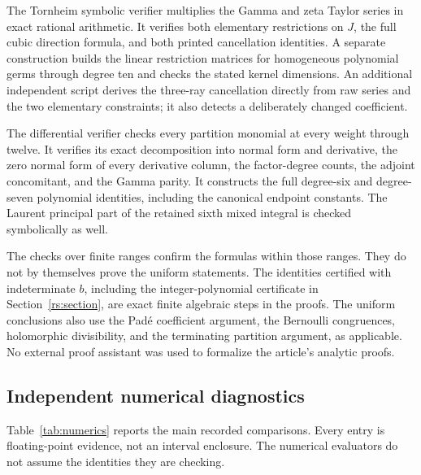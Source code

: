 The Tornheim symbolic verifier multiplies the Gamma and zeta Taylor
series in exact rational arithmetic. It verifies both elementary
restrictions on $J$, the full cubic direction formula, and both printed
cancellation identities. A separate construction builds the linear
restriction matrices for homogeneous polynomial germs through degree ten
and checks the stated kernel dimensions. An additional independent script
derives the three-ray cancellation directly from raw series and the two
elementary constraints; it also detects a deliberately changed coefficient.

The differential verifier checks every partition monomial at every
weight through twelve. It verifies its exact decomposition into normal
form and derivative, the zero normal form of every derivative column,
the factor-degree counts, the adjoint concomitant, and the Gamma parity.
It constructs the full degree-six and degree-seven polynomial identities,
including the canonical endpoint constants. The Laurent principal part
of the retained sixth mixed integral is checked symbolically as well.

The checks over finite ranges confirm the formulas within those
ranges. They do not by themselves prove the uniform statements.
The identities certified with indeterminate $b$, including the
integer-polynomial certificate in Section~\ref{rs:section}, are exact
finite algebraic steps in the proofs. The uniform conclusions also
use the Pad\'e coefficient argument, the Bernoulli congruences,
holomorphic divisibility, and the terminating partition argument,
as applicable. No external proof assistant was used to formalize
the article's analytic proofs.

\subsection{Independent numerical diagnostics}

Table~\ref{tab:numerics} reports the main recorded comparisons. Every
entry is floating-point evidence, not an interval enclosure. The numerical
evaluators do not assume the identities they are checking.

